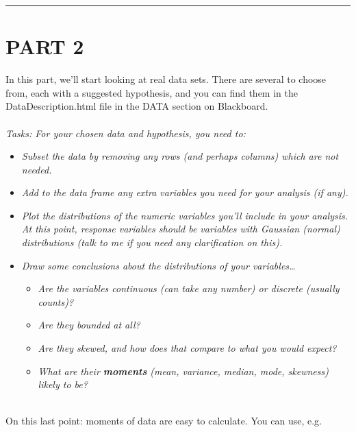\documentclass[
]{book}
\newenvironment{Shaded}{\begin{snugshade}}{\end{snugshade}}
\newcommand{\CommentTok}[1]{\textcolor[rgb]{0.56,0.35,0.01}{\textit{#1}}}
\newcommand{\KeywordTok}[1]{\textcolor[rgb]{0.13,0.29,0.53}{\textbf{#1}}}
\newcommand{\NormalTok}[1]{#1}
\newcommand{\OperatorTok}[1]{\textcolor[rgb]{0.81,0.36,0.00}{\textbf{#1}}}
\newcommand{\StringTok}[1]{\textcolor[rgb]{0.31,0.60,0.02}{#1}}
\providecommand{\tightlist}{%
  \setlength{\itemsep}{0pt}\setlength{\parskip}{0pt}}
\begin{document}
\begin{center}\rule{0.5\linewidth}{\linethickness}\end{center}

\hypertarget{part-2}{%
\section{PART 2}\label{part-2}}

In this part, we'll start looking at real data sets. There are several
to choose from, each with a suggested hypothesis, and you can find them in the
DataDescription.html file in the DATA section on Blackboard.\\
~\\

\emph{Tasks: For your chosen data and hypothesis, you need to:}

\begin{itemize}
\tightlist
\item
  \emph{Subset the data by removing any rows (and perhaps columns) which are not
  needed.}
\item
  \emph{Add to the data frame any extra variables you need for your analysis (if any).}
\item
  \emph{Plot the distributions of the numeric variables you'll include in your
  analysis. At this point, response variables should be variables with Gaussian (normal) distributions (talk to me if you need any clarification on this).}
\item
  \emph{Draw some conclusions about the distributions of your variables\ldots{}}

  \begin{itemize}
  \tightlist
  \item
    \emph{Are the variables continuous (can take any number) or discrete (usually counts)?}
  \item
    \emph{Are they bounded at all?}
  \item
    \emph{Are they skewed, and how does that compare to what you would expect?}
  \item
    \emph{What are their \textbf{moments} (mean, variance, median, mode, skewness) likely to be?}\\
    ~\\
  \end{itemize}
\end{itemize}

On this last point: moments of data are easy to calculate. You can use, e.g.

\begin{Shaded}
\end{Shaded}
\end{document}

